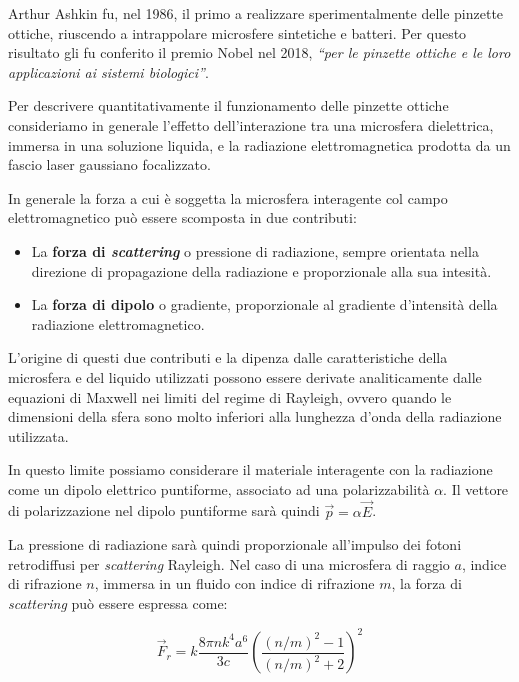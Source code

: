 Arthur Ashkin fu, nel 1986, il primo a realizzare sperimentalmente delle pinzette ottiche, riuscendo a intrappolare microsfere sintetiche e batteri\cite{Ashkin:86}. Per questo risultato gli fu conferito il premio Nobel nel 2018, \emph{``per le pinzette ottiche e le loro applicazioni ai sistemi biologici''}.

Per descrivere quantitativamente il funzionamento delle pinzette
ottiche consideriamo in generale l'effetto dell'interazione tra
una microsfera dielettrica, immersa in una soluzione liquida, e
la radiazione elettromagnetica prodotta da un fascio laser gaussiano
focalizzato.

In generale la forza a cui è soggetta la microsfera interagente
col campo elettromagnetico può essere scomposta in due contributi:

\begin{itemize}
    \item La \textbf{forza di \textit{scattering}} o pressione di radiazione, sempre orientata nella direzione di propagazione
    della radiazione e proporzionale alla sua intesità.
    \item La \textbf{forza di dipolo} o gradiente, proporzionale
    al gradiente d'intensità della radiazione elettromagnetico.
\end{itemize}

L'origine di questi due contributi e la dipenza dalle caratteristiche
della microsfera e del liquido utilizzati possono essere derivate
analiticamente dalle equazioni di Maxwell nei limiti del regime
di Rayleigh, ovvero quando le dimensioni della sfera sono molto
inferiori alla lunghezza d'onda della radiazione utilizzata.

In questo limite possiamo considerare il materiale interagente con la
radiazione come un dipolo elettrico puntiforme, associato ad una
polarizzabilità $\alpha$. Il vettore di polarizzazione nel dipolo puntiforme sarà quindi $\vec{p} = \alpha \vec{E}$.

La pressione di radiazione sarà quindi proporzionale all'impulso
dei fotoni retrodiffusi per \textit{scattering} Rayleigh.
Nel caso di una microsfera di raggio $a$, indice di rifrazione $n$,
immersa in un fluido con indice di rifrazione $m$, la forza di
\textit{scattering} può essere espressa\cite{HARADA1996529} come:

\begin{equation}
\vec{F}_r = \hat{k} \frac{8 \pi n k^4 a^6}{3c}
\left(
\frac{(n/m)^2 - 1}{(n/m)^2 + 2}
\right)^2
\end{equation}

